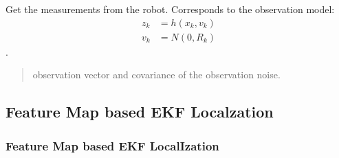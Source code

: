 \documentclass[letterpaper,10pt,english]{sphinxmanual}
\begin{document}
\begin{fulllineitems}
\begin{fulllineitems}
\begin{quote}
\begin{description}
\end{description}\end{quote}

\end{fulllineitems}


\begin{fulllineitems}
\label{\detokenize{GFLocalization:EKF_3DOFDifferentialDriveCtVelocity.EKF_3DOFDifferentialDriveCtVelocity.GetMeasurements}}
\pysigstartsignatures
{}
\pysigstopsignatures
\sphinxAtStartPar
Get the measurements from the robot. Corresponds to the observation model:
\begin{equation}\label{equation:GFLocalization:eq-h}
\begin{split}z_k &= h(x_{k},v_k) \\
v_k &= N(0,R_k)\end{split}
\end{equation}
\sphinxAtStartPar
{} .
\begin{quote}\begin{description}
\sphinxAtStartPar
observation vector and covariance of the observation noise.

\end{description}\end{quote}

\end{fulllineitems}


\end{fulllineitems}



\subsection{Feature Map based EKF Localzation}
\label{\detokenize{Localization_index:feature-map-based-ekf-localzation}}
\sphinxstepscope


\subsubsection{Feature Map based EKF LocalIzation}
\label{\detokenize{FEKFMBLocalization:feature-map-based-ekf-localization}}\label{\detokenize{FEKFMBLocalization::doc}}
\end{document}
